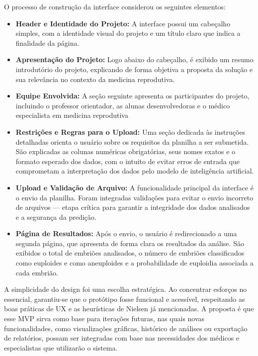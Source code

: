 O processo de construção da interface considerou os seguintes elementos:
\begin{itemize}
    \item \textbf{Header e Identidade do Projeto:} A interface possui um cabeçalho simples, com a identidade visual do projeto e um título claro que indica a finalidade da página.

    \item \textbf{Apresentação do Projeto:} Logo abaixo do cabeçalho, é exibido um resumo introdutório do projeto, explicando de forma objetiva a proposta da solução e sua relevância no contexto da medicina reprodutiva.

    \item \textbf{Equipe Envolvida:} A seção seguinte apresenta os participantes do projeto, incluindo o professor orientador, as alunas desenvolvedoras e o médico especialista em medicina reprodutiva

    \item \textbf{Restrições e Regras para o Upload:} Uma seção dedicada às instruções detalhadas orienta o usuário sobre os requisitos da planilha a ser submetida. São explicadas as colunas numéricas obrigatórias, seus nomes exatos e o formato esperado dos dados, com o intuito de evitar erros de entrada que comprometam a interpretação dos dados pelo modelo de inteligência artificial.

    \item \textbf{Upload e Validação de Arquivo:} A funcionalidade principal da interface é o envio da planilha. Foram integradas validações para evitar o envio incorreto de arquivos — etapa crítica para garantir a integridade dos dados analisados e a segurança da predição.

    \item \textbf{Página de Resultados:} Após o envio, o usuário é redirecionado a uma segunda página, que apresenta de forma clara os resultados da análise. São exibidos o total de embriões analisados, o número de embriões classificados como euploides e como aneuploides e a probabilidade de euploidia associada a cada embrião.

\end{itemize}

A simplicidade do design foi uma escolha estratégica. Ao concentrar esforços no essencial, garantiu-se que o protótipo fosse funcional e acessível, respeitando as boas práticas de UX e as heurísticas de Nielsen já mencionadas. A proposta é que esse MVP sirva como base para iterações futuras, nas quais novas funcionalidades, como visualizações gráficas, histórico de análises ou exportação de relatórios, possam ser integradas com base nas necessidades dos médicos e especialistas que utilizarão o sistema.

